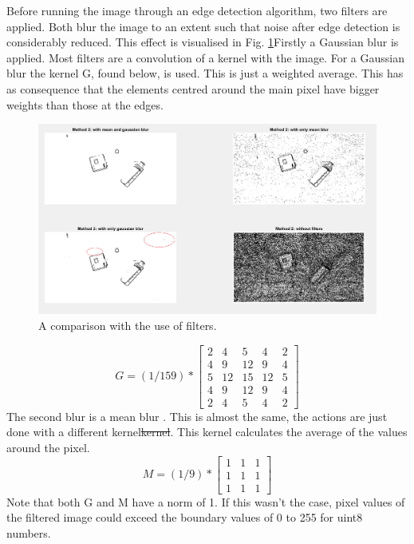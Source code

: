 \documentclass{article}
\providecommand{\DIFaddtex}[1]{{\protect\color{blue}\uwave{#1}}} %
\providecommand{\DIFdeltex}[1]{{\protect\color{red}\sout{#1}}}                      %
\providecommand{\DIFaddbegin}{} %
\providecommand{\DIFaddend}{} %
\providecommand{\DIFdelbegin}{} %
\providecommand{\DIFdelend}{} %
\providecommand{\DIFadd}[1]{\texorpdfstring{\DIFaddtex{#1}}{#1}} %
\providecommand{\DIFdel}[1]{\texorpdfstring{\DIFdeltex{#1}}{}} %
\newcommand{\DIFscaledelfig}{0.5}
\newlength{\DIFdelgraphicswidth} %
\newlength{\DIFdelgraphicsheight} %
\newcommand{\DIFaddincludegraphics}[2][]{{\color{blue}\fbox{\DIFOincludegraphics[#1]{#2}}}} %
\newcommand{\DIFdelincludegraphics}[2][]{%
\sbox{\DIFdelgraphicsbox}{\DIFOincludegraphics[#1]{#2}}%
\settoboxwidth{\DIFdelgraphicswidth}{\DIFdelgraphicsbox} %
\settoboxtotalheight{\DIFdelgraphicsheight}{\DIFdelgraphicsbox} %
\scalebox{\DIFscaledelfig}{%
\parbox[b]{\DIFdelgraphicswidth}{\usebox{\DIFdelgraphicsbox}\\[-\baselineskip] \rule{\DIFdelgraphicswidth}{0em}}\llap{\resizebox{\DIFdelgraphicswidth}{\DIFdelgraphicsheight}{%
\setlength{\unitlength}{\DIFdelgraphicswidth}%
\begin{picture}(1,1)%
\thicklines\linethickness{2pt} %
{\color[rgb]{1,0,0}\put(0,0){\framebox(1,1){}}}%
{\color[rgb]{1,0,0}\put(0,0){\line( 1,1){1}}}%
{\color[rgb]{1,0,0}\put(0,1){\line(1,-1){1}}}%
\end{picture}%
}\hspace*{3pt}}} %
} %
\DeclareRobustCommand{\DIFaddbegin}{\DIFOaddbegin \let\includegraphics\DIFaddincludegraphics} %
\DeclareRobustCommand{\DIFaddend}{\DIFOaddend \let\includegraphics\DIFOincludegraphics} %
\DeclareRobustCommand{\DIFdelbegin}{\DIFOdelbegin \let\includegraphics\DIFdelincludegraphics} %
\DeclareRobustCommand{\DIFdelend}{\DIFOaddend \let\includegraphics\DIFOincludegraphics} %
\begin{document}
\DIFaddend Before running the image through an edge detection algorithm, two filters are applied. Both blur the image to an extent such that noise after edge detection is considerably reduced. This effect is visualised in Fig. \ref{fig:filter_comparison}\DIFaddbegin \DIFadd{.
}\DIFaddend Firstly a Gaussian blur\cite{gaussian} is applied. Most filters are a convolution of a kernel with the image. For a Gaussian blur the kernel G, found below, is used. This is just a weighted average. This has as consequence that the elements centred around the main pixel have bigger weights than those at the edges.
\begin{figure}[h]
\center
\includegraphics[width=0.7\linewidth]{filter_comparison.png}
\caption{A comparison with the use of filters.}
\label{fig:filter_comparison}
\end{figure}
\begin{equation}
G = (1/159) * 
\begin{bmatrix}
2 & 4 & 5 & 4 & 2\\
4 & 9 & 12 & 9 & 4\\
5 & 12 & 15 & 12 & 5\\
4 & 9 & 12 & 9& 4\\
2 & 4 & 5 & 4 & 2
\end{bmatrix}
\end{equation}
The second blur is a mean blur \cite{mean}. This is almost the same, the actions are just done with a different kernel\DIFdelbegin \DIFdel{kernel}\DIFdelend . This kernel calculates the average of the values around the pixel.
\begin{equation}
M = (1/9) * 
\begin{bmatrix}
1&1&1\\
1&1&1\\
1&1&1
\end{bmatrix}
\end{equation}
Note that both G and M have a norm of 1. If this wasn't the case, pixel values of the filtered image could exceed the boundary values of 0 to 255 for uint8 numbers. 
\end{document}
